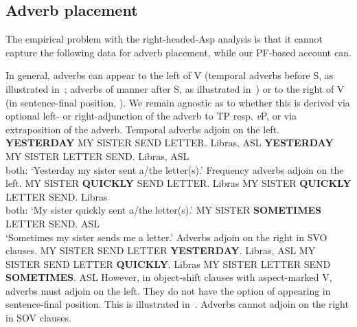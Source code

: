 \documentclass[output=paper]{langscibook}
\begin{document}
\subsection{Adverb placement}
\label{lasz:sec:32}
\largerpage

The empirical problem with the right-headed-Asp analysis is that it
cannot capture the following data for adverb placement, while our PF-based account can.

In general, adverbs can appear to the left of V (temporal
adverbs before S, as illustrated in~; adverbs of manner after S, as
illustrated in~) or to the right of V (in sentence-final position,
). We remain agnostic as to whether this is derived via optional
left- or right-adjunction of the adverb to TP resp. \textit{v}P, or via
extraposition of the adverb.
\ea 
    \label{lasz:ex:20}
    Temporal adverbs adjoin on the left.
    \ea 
        \textbf{{YESTERDAY}} {MY} {SISTER} {SEND}\laszPlain{} {LETTER}.
        \hfill 
        \cmark Libras, \cmark ASL 
    \ex 
        \textbf{{YESTERDAY}} {MY} {SISTER} {LETTER} {SEND}\laszAsp{}.
        \hfill 
        \cmark Libras, \cmark ASL 
        \\ 
        both: ‘Yesterday my sister sent a/the letter(s).’
    \z 
\ex 
    \label{lasz:ex:21}
    Frequency adverbs adjoin on the left.
    \ea 
        {MY} {SISTER} \textbf{{QUICKLY}} {SEND}\laszPlain{} {LETTER}.
        \hfill 
        \cmark Libras 
    \ex 
        {MY} {SISTER} \textbf{{QUICKLY}} {LETTER} {SEND}\laszAsp{}.
        \hfill 
        \cmark Libras 
        \\ 
        both: ‘My sister quickly sent a/the letter(s).’
    \ex 
        {MY} {SISTER} \textbf{{SOMETIMES}} {LETTER} {SEND}.
        \hfill 
        \cmark ASL 
        \\ 
        ‘Sometimes my sister sends me a letter.’
    \z 
\ex 
    \label{lasz:ex:22}
    Adverbs adjoin on the right in SVO clauses.
    \ea 
        {MY} {SISTER} {SEND}\laszPlain{} {LETTER} \textbf{{YESTERDAY}}.
        \hfill 
        \cmark Libras, \cmark ASL 
    \ex 
        {MY} {SISTER} {SEND}\laszPlain{} {LETTER} \textbf{{QUICKLY}}.
        \hfill 
        \cmark Libras 
    \ex 
        {MY} {SISTER} {LETTER} {SEND} \textbf{{SOMETIMES}}.
        \hfill 
        \cmark ASL 
    \z 
\z 
However, in object-shift clauses with aspect-marked V, adverbs must
adjoin on the left. They do not have the option of appearing in
sentence-final position. This is illustrated in~.
\ea 
    \label{lasz:ex:23}
    Adverbs cannot adjoin on the right in SOV\laszAsp{} clauses.
    \z 
\z 
\end{document}
